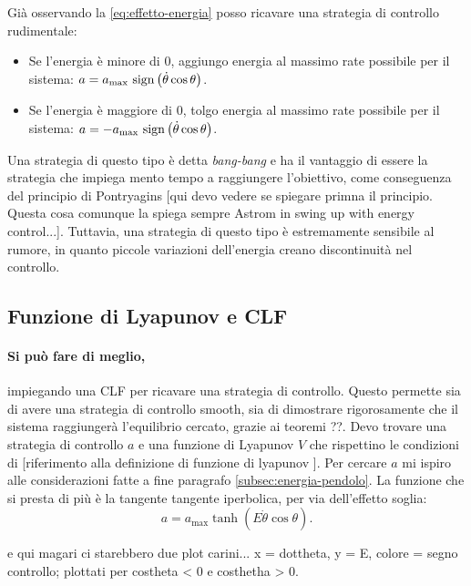 Già osservando la \eqref{eq:effetto-energia} posso ricavare una strategia di controllo rudimentale:
\begin{itemize}
    \item Se l'energia è minore di $0$, aggiungo energia al massimo rate possibile per il sistema: $a = a_{\max}\ \mathrm{sign}\left(\dot \theta \cos \theta\right)$.
    \item Se l'energia è maggiore di $0$, tolgo energia al massimo rate possibile per il sistema: $a = -a_{\max}\ \mathrm{sign}\left(\dot \theta \cos \theta\right)$.
\end{itemize}
Una strategia di questo tipo è detta \emph{bang-bang} e ha il vantaggio di essere la strategia che impiega mento tempo a raggiungere l'obiettivo, come conseguenza del principio di Pontryagins [qui devo vedere se spiegare primna il principio. Questa cosa comunque la spiega sempre Astrom in swing up with energy control...]. Tuttavia, una strategia di questo tipo è estremamente sensibile al rumore, in quanto piccole variazioni dell'energia creano discontinuità nel controllo.


\subsection{Funzione di Lyapunov e CLF}
\paragraph{Si può fare di meglio,} impiegando una CLF per ricavare una strategia di controllo. Questo permette sia di avere una strategia di controllo smooth, sia di dimostrare rigorosamente che il sistema raggiungerà l'equilibrio cercato, grazie ai teoremi ??.
Devo trovare una strategia di controllo $a$ e una funzione di Lyapunov $V$ che rispettino le condizioni di [riferimento alla definizione di funzione di lyapunov ].
Per cercare $a$ mi ispiro alle considerazioni fatte a fine paragrafo \ref{subsec:energia-pendolo}. La funzione che si presta di più è la tangente tangente iperbolica, per via dell'effetto soglia:
\begin{equation}
    a = a_{\max} \tanh(E \dot \theta \cos \theta).
    \label{eq:control-strategy-test}
\end{equation}

e qui magari ci starebbero due plot carini...
x = dottheta, y = E, colore = segno controllo; plottati per costheta < 0 e costhetha > 0. %


